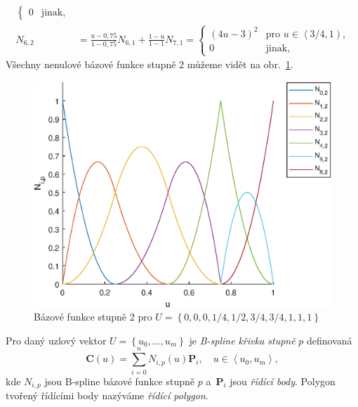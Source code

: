 \begin{priklad}
\begin{align*}
\begin{cases}
		0 & \text{jinak,}
	\end{cases}\\
	N_{6,2}&=\frac{u-0,75}{1   -0,75}N_{6,1}+\frac{1-u}   {1   -1}   N_{7,1}=
	\begin{cases}
		\left(4u-3\right)^2 & \text{pro $u\in\left\langle 3/4,1 \right)$,}\\
		0 & \text{jinak,}
	\end{cases}
	\end{align*}
	Všechny nenulové bázové funkce stupně 2 můžeme vidět na obr.~\ref{graf2}.
	\begin{figure}[!h]
		\begin{center}
			\includegraphics*[]{obr/graf2}
		\end{center}
		\caption{Bázové funkce stupně 2 pro $U=\left\lbrace 0,0,0,1/4,1/2,3/4,3/4,1,1,1\right\rbrace $}
		\label{graf2}
	\end{figure}
\end{priklad}

\begin{definice}
	Pro daný uzlový vektor $U=\left\{u_0,\dots,u_m\right\}$ je \emph{B-spline křivka stupně} $p$ definovaná
	\begin{equation}
		\mathbf{C}\left(u\right)=\sum _{i=0}^{n}{N}_{i,p}\left(u\right)\mathbf{P}_i, \quad u \in \left\langle u_0,u_m \right\rangle,
	\end{equation}
	kde ${N}_{i,p}$ jsou B-spline bázové funkce stupně $p$ a~$\mathbf{P}_i$ jsou \emph{řídící body}. Polygon tvořený řídícími body nazýváme \emph{řídící polygon}.
\end{definice}

